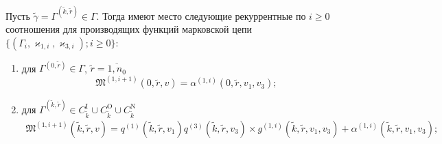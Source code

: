 \documentclass[a4paper,12pt,russian]{extarticle}
\begin{document}
\begin{theorem}
Пусть $\tilde{\gamma}=\Gamma^{(\tilde{k},\tilde{r})} \in \Gamma$. Тогда имеют место следующие рекуррентные по $i \geqslant 0$ соотношения для производящих функций марковской цепи $\{(\Gamma_i, \varkappa_{1,i},\varkappa_{3,i}); i \geqslant 0\}$:
\begin{enumerate}

\item для $ \Gamma^{(0,\tilde{r})} \in \Gamma$, $\tilde{r} = \overline{1,n_0}$ 
$$
\mathfrak{M}^{(1,i+1)}(0,\tilde{r},v) = \alpha^{(1,i)}(0,\tilde{r},v_1,v_3);
$$
\item для $\Gamma^{(\tilde{k},\tilde{r})} \in C_{\tilde{k}}^{\mathrm{I}} \cup C_{\tilde{k}}^{\mathrm{O}} \cup C_{\tilde{k}}^{\mathrm{N}}$
\begin{multline*}
\mathfrak{M}^{(1,i+1)}(\tilde{k},\tilde{r},v) = q^{(1)}(\tilde{k},\tilde{r},v_1) q^{(3)}(\tilde{k},\tilde{r},v_3) \times g^{(1,i)}(\tilde{k},\tilde{r},v_1,v_3)
     + \alpha^{(1,i)}(\tilde{k},\tilde{r},v_1,v_3);
\end{multline*}
\end{enumerate}

\label{theorem:gen:rek:1}
\end{theorem}
\end{document}
